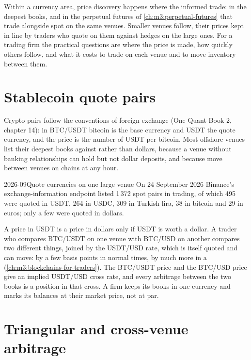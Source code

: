 Within a currency area, price discovery happens where the informed trade: in the deepest books, and in the
perpetual futures of \cref{ch:m3:perpetual-futures} that trade alongside spot on the same venues.
Smaller venues follow, their prices kept in line by traders who quote on them against hedges on the large
ones. For a trading firm the practical questions are where the price is made, how quickly others follow,
and what it costs to trade on each venue and to move inventory between them.

\section{Stablecoin quote pairs}

Crypto pairs follow the conventions of foreign exchange (One Quant Book 2, chapter 14): in BTC/USDT
bitcoin is the base currency and USDT the quote currency, and the price is the number of USDT per bitcoin.
Most offshore venues list their deepest books against  rather than dollars, because a venue
without banking relationships can hold  but not dollar deposits, and because  move
between venues on chains at any hour.

\begin{dated}{2026-09}{Quote currencies on one large venue}\label{dat:m3:spot-markets:quotes}
On 24 September 2026 Binance's exchange-information endpoint listed 1\,372 spot pairs in trading, of
which 495 were quoted in USDT, 264 in USDC, 309 in Turkish lira, 38 in bitcoin and 29 in euros; only a
few were quoted in dollars.
\end{dated}

A price in USDT is a price in dollars only if USDT is worth a dollar. A trader who compares BTC/USDT on one
venue with BTC/USD on another compares two different things, joined by the USDT/USD rate, which is itself
quoted and can move: by a few basis points in normal times, by much more in a 
(\cref{ch:m3:blockchains-for-traders}). The BTC/USDT price and the BTC/USD price give an implied USDT/USD
cross rate, and every arbitrage between the two books is a position in that cross. A firm keeps its books
in one currency and marks its  balances at their market price, not at par.

\section{Triangular and cross-venue arbitrage}

